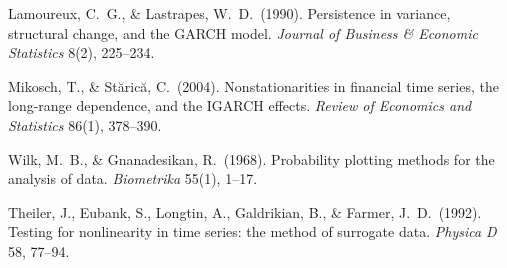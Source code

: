 \documentclass[11pt,a4paper]{article}
\makeatletter
\DeclareRobustCommand{\_}{\ifmmode\nfss@text{\textunderscore}\else\textunderscore\allowbreak\fi}
\makeatother
\begin{document}
{\begin{enumerate}[label={\textbf{[\arabic*]}},leftmargin=2.8em,itemsep=4pt,parsep=0pt,topsep=2pt]
\item \hypertarget{R:42}{}%
  Lamoureux, C.\ G., \& Lastrapes, W.\ D.\ (1990). Persistence in variance, structural change, and the GARCH model. \textit{Journal of Business \& Economic Statistics} 8(2), 225--234.

\item \hypertarget{R:43}{}%
  Mikosch, T., \& St\u{a}ric\u{a}, C.\ (2004). Nonstationarities in financial time series, the long-range dependence, and the IGARCH effects. \textit{Review of Economics and Statistics} 86(1), 378--390.

\item \hypertarget{R:44}{}%
  Wilk, M.\ B., \& Gnanadesikan, R.\ (1968). Probability plotting methods for the analysis of data. \textit{Biometrika} 55(1), 1--17.

\item \hypertarget{R:45}{}%
  Theiler, J., Eubank, S., Longtin, A., Galdrikian, B., \& Farmer, J.\ D.\ (1992). Testing for nonlinearity in time series: the method of surrogate data. \textit{Physica D} 58, 77--94.

\end{enumerate}
}

\end{document}

